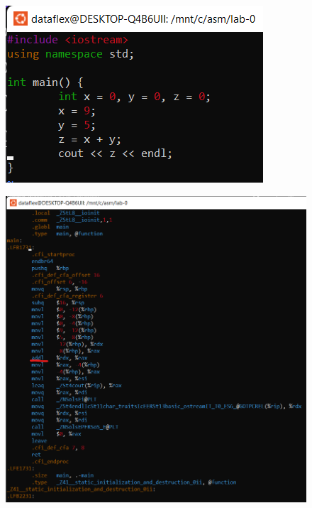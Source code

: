 \documentclass[a4paper,12pt]{article}
\begin{document}
\begin{figure}[h] %
	\centering
	\includegraphics[width=0.8\linewidth]{arithmetic cpp.png}
\end{figure}


\begin{figure}[h] %
	\centering
	\includegraphics[width=0.8\linewidth]{arithmetic add.png}
\end{figure}
\end{document}
